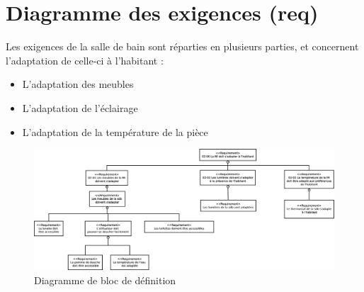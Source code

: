 \chapter{Diagramme des exigences (req)}\label{req}
Les exigences de la salle de bain sont réparties en plusieurs parties, et concernent l'adaptation de celle-ci à l'habitant : 
\begin{itemize}
	\item L'adaptation des meubles
	\item L'adaptation de l'éclairage
	\item L'adaptation de la température de la pièce
\end{itemize}
\begin{figure}[H]
	\centering
	\includegraphics[width=1\linewidth]{diagrams/bathroom/diagramme_exiquences_req.eps}
	\caption{Diagramme de bloc de définition}
	\label{fig:requirements}
\end{figure}
